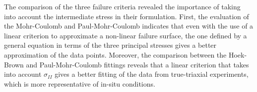 The comparison of the three failure criteria revealed the importance of taking into account the intermediate stress in their formulation. First, the evaluation of the Mohr-Coulomb and Paul-Mohr-Coulomb indicates that even with the use of a linear criterion to approximate a non-linear failure surface, the one defined by a general equation in terms of the three principal stresses gives a better approximation of the data points. Moreover, the comparison between the Hoek-Brown and Paul-Mohr-Coulomb fittings reveals that a linear criterion that takes into account $\sigma_{II}$ gives a better fitting of the data from true-triaxial experiments, which is more representative of in-situ conditions. 




